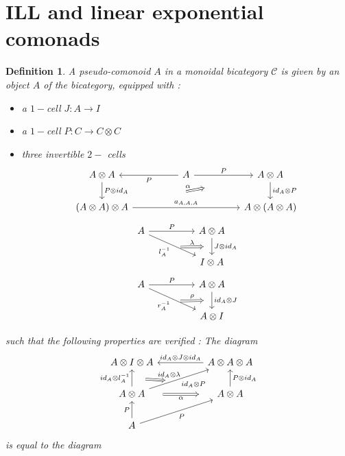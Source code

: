 \documentclass[a4paper, 12pt, twoside,openright]{report}
\newtheorem{definition}{Definition}
\begin{document}
\section{ILL and linear exponential comonads}
\begin{definition}
A pseudo-comonoid $A$ in a monoidal bicategory $\mathcal{C}$ is given by an object $A$ of the bicategory, equipped with :
\begin{itemize}
\item a $1-$cell $J: A \rightarrow I$
\item a $1-$cell $P:C \rightarrow C \otimes C$
\item three invertible $2-$ cells 
$$\begin{tikzcd}
A \otimes A
\arrow{d}{ P \otimes id_A}
&&
A
\arrow{ll}{P}
\arrow{rr}{P}
&&
A \otimes A
\arrow{d}{id_A \otimes P}
\\
(A \otimes A) \otimes A
\arrow{rrrr}{a_{A,A,A}}
\arrow[Rightarrow, shorten >=1.8cm, shorten <=2.0cm]{rrrru}{\alpha}
&&&&
A \otimes (A \otimes A)
\end{tikzcd}
$$
$$
\begin{tikzcd}
A
\arrow{rr}{P}
\arrow[swap]{rrd}{l_{A}^{-1}}[name=A]{}
&&
A \otimes A
\arrow{d}{J \otimes id_A}[name=B]{}
\\
&&
I \otimes A
\arrow[Rightarrow, from=A,to=B, shorten >=0.3cm, shorten <=0.3cm]{}{\lambda}
\end{tikzcd}
$$
$$
\begin{tikzcd}
A
\arrow{rr}{P}
\arrow[swap]{rrd}{r_{A}^{-1}}[name=A]{}
&&
A \otimes A
\arrow{d}{  id_A\otimes J}[name=B]{}
\\
&&
A \otimes I
\arrow[Rightarrow, from=A,to=B, shorten >=0.3cm, shorten <=0.3cm]{}{\rho}
\end{tikzcd}
$$
\end{itemize}
such that the following properties are verified : 
The diagram $$
\begin{tikzcd}
A \otimes I \otimes A
&&
A \otimes A \otimes A
\arrow[swap]{ll}{id_A \otimes J \otimes id_A}
\\
A \otimes A
\arrow{u}{id_A \otimes l_{A}^{-1}}[name=A]{}
\arrow[Rightarrow, swap,shorten >=0.5cm, shorten <=0.5cm]{rr}{\alpha}
\arrow[swap]{urr}{id_A \otimes P}[name=B]{}
&&
A \otimes A
\arrow[swap]{u}{P \otimes id_A}
\\
A
\arrow{u}{P}
\arrow[swap]{urr}{P}
\arrow[Rightarrow, from=A,to=B, shorten >=0.5cm, shorten <=0.5cm]{}{id_A \otimes \lambda}
\end{tikzcd}
$$
is equal to the diagram
$$
\begin{tikzcd}

\end{tikzcd}$$
\end{definition}
\end{document}

